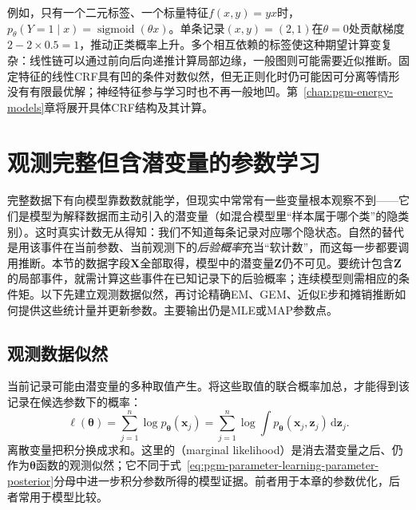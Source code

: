 例如，只有一个二元标签、一个标量特征$f(x,y)=yx$时，$p_\theta(Y=1\mid x)=\operatorname{sigmoid}(\theta x)$。单条记录$(x,y)=(2,1)$在$\theta=0$处贡献梯度$2-2\times0.5=1$，推动正类概率上升。多个相互依赖的标签使这种期望计算变复杂：线性链可以通过前向后向递推计算局部边缘，一般图则可能需要近似推断。固定特征的线性CRF具有凹的条件对数似然，但无正则化时仍可能因可分离等情形没有有限最优解；神经特征参与学习时也不再一般地凹。第~\ref{chap:pgm-energy-models}章将展开具体CRF结构及其计算。

\section{观测完整但含潜变量的参数学习}
\label{sec:pgm-parameter-learning-latent}

完整数据下有向模型靠数数就能学，但现实中常常有一些变量根本观察不到——它们是模型为解释数据而主动引入的潜变量（如混合模型里“样本属于哪个类”的隐类别）。这时真实计数无从得知：我们不知道每条记录对应哪个隐状态。自然的替代是用该事件在当前参数、当前观测下的\emph{后验概率}充当“软计数”，而这每一步都要调用推断。本节的数据字段$\bm{X}$全部取得，模型中的潜变量$\bm{Z}$仍不可见。要统计包含$\bm{Z}$的局部事件，就需计算这些事件在已知记录下的后验概率；连续模型则需相应的条件矩。以下先建立观测数据似然，再讨论精确EM、GEM、近似E步和摊销推断如何提供这些统计量并更新参数。主要输出仍是MLE或MAP参数点。

\subsection{观测数据似然}
\label{sec:pgm-parameter-learning-marginal-likelihood}

当前记录可能由潜变量的多种取值产生。将这些取值的联合概率加总，才能得到该记录在候选参数下的概率：
\begin{equation}
  \ell(\bm{\theta})
    =\sum_{j=1}^n\log p_{\bm{\theta}}(\bm{x}_j)
    =\sum_{j=1}^n
       \log\int p_{\bm{\theta}}(\bm{x}_j,\bm{z}_j)
                         \,\mathrm{d}\bm{z}_j.
  \label{eq:pgm-parameter-learning-observed-likelihood}
\end{equation}
离散变量把积分换成求和。这里的（marginal likelihood）是消去潜变量之后、仍作为$\bm{\theta}$函数的观测似然；它不同于式~\eqref{eq:pgm-parameter-learning-parameter-posterior}分母中进一步积分参数所得的模型证据。前者用于本章的参数优化，后者常用于模型比较。

